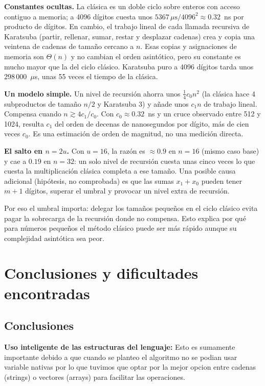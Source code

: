 \documentclass[11pt,a4paper]{article}
\begin{document}
\textbf{Constantes ocultas.} La clásica es un doble ciclo sobre enteros con
acceso contiguo a memoria; a 4096 dígitos cuesta unos
$5367\,\mu\text{s}/4096^2 \approx 0.32$~ns por producto de dígitos. En cambio, el
trabajo lineal de cada llamada recursiva de Karatsuba (partir, rellenar, sumar,
restar y desplazar cadenas) crea y copia una veintena de cadenas de tamaño
cercano a $n$. Esas copias y asignaciones de memoria son $\Theta(n)$ y no
cambian el orden asintótico, pero su constante es mucho mayor que la del ciclo
clásico. Karatsuba puro a 4096 dígitos tarda unos 298\,000~$\mu$s, unas 55
veces el tiempo de la clásica.

\textbf{Un modelo simple.} Un nivel de recursión ahorra unos $\tfrac14 c_0 n^2$
(la clásica hace 4 subproductos de tamaño $n/2$ y Karatsuba 3) y añade unos
$c_1 n$ de trabajo lineal. Compensa cuando $n \gtrsim 4c_1/c_0$. Con
$c_0 \approx 0.32$~ns y un cruce observado entre 512 y 1024, resulta $c_1$ del
orden de decenas de nanosegundos por dígito, más de cien veces $c_0$. Es una
estimación de orden de magnitud, no una medición directa.

\textbf{El salto en $n = 2u$.} Con $u=16$, la razón es $\approx 0.9$ en $n=16$
(mismo caso base) y cae a $0.19$ en $n=32$: un solo nivel de recursión cuesta
unas cinco veces lo que cuesta la multiplicación clásica completa a ese tamaño.
Una posible causa adicional (hipótesis, no comprobada) es que las sumas
$x_1+x_0$ pueden tener $m+1$ dígitos, superar el umbral y provocar un nivel
extra de recursión.

Por eso el umbral importa: delegar los tamaños pequeños en el ciclo clásico
evita pagar la sobrecarga de la recursión donde no compensa. Esto explica por
qué para números pequeños el método clásico puede ser más rápido aunque su
complejidad asintótica sea peor.

\section{Conclusiones y dificultades encontradas}

\subsection{Conclusiones}

\textbf{Uso inteligente de las estructuras del lenguaje: } Esto es sumamente importante debido a que cuando se planteo el algoritmo no se podian usar variable nativas por lo que tuvimos que optar
por la mejor opcion entre cadenas (strings) o vectores (arrays) para facilitar las operaciones.
\end{document}
